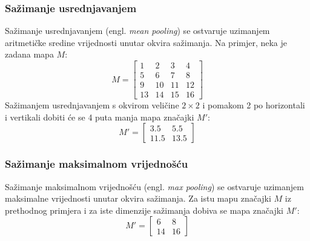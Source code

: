 \documentclass[times, utf8, zavrsni, numeric]{fer}
\begin{document}
\subsubsection{Sažimanje usrednjavanjem}
Sažimanje usrednjavanjem (engl. \textit{mean pooling}) se ostvaruje uzimanjem aritmetičke sredine vrijednosti unutar okvira sažimanja. Na primjer, neka je zadana mapa $M$:
$$ M = \left[
\begin{matrix}
1 & 2 & 3 & 4 \\
5 & 6 & 7 & 8 \\ 
9 & 10 & 11 & 12 \\
13 & 14 & 15 & 16
\end{matrix} \right]
$$
Sažimanjem usrednjavanjem s okvirom veličine $2 \times 2$ i pomakom 2 po horizontali i vertikali dobiti će se 4 puta manja mapa značajki $M'$:
$$M' = \left[
\begin{matrix}
3.5 & 5.5 \\
11.5 & 13.5
\end{matrix} \right]
$$

\subsubsection{Sažimanje maksimalnom vrijednošću}
Sažimanje maksimalnom vrijednošću (engl. \textit{max pooling}) se ostvaruje uzimanjem maksimalne vrijednosti unutar okvira sažimanja. Za istu mapu značajki $M$ iz prethodnog primjera i za iste dimenzije sažimanja dobiva se mapa značajki $M'$:
$$M'= \left[
\begin{matrix}
6 & 8 \\
14 & 16
\end{matrix} \right]
$$
\end{document}
